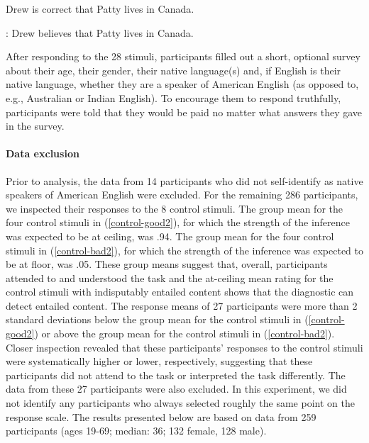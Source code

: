 \documentclass[11pt,fleqn]{article}
\newcommand{\6}{\mbox{$[\hspace*{-.6mm}[$}}
\newcommand{\9}{\mbox{$]\hspace*{-.6mm}]$}}
\begin{document}
\begin{exe}
\ex\label{train2}
\begin{xlist}
 Drew is correct that Patty lives in Canada. 

: Drew believes that Patty lives in Canada.
\end{xlist}
\end{exe}

After responding to the 28 stimuli, participants filled out a short, optional survey about their age, their gender, their native language(s) and, if English is their native language, whether they are a speaker of American English (as opposed to, e.g., Australian or Indian English). To encourage them to respond truthfully, participants were told that they would be paid no matter what answers they gave in the survey.

\paragraph{Data exclusion}

Prior to analysis, the data from 14 participants who did not self-identify as native speakers of American English were excluded. For the remaining 286 participants, we inspected their responses to the 8 control stimuli. The group mean for the four control stimuli in (\ref{control-good2}), for which the strength of the inference was expected to be at ceiling, was .94. The group mean for the four control stimuli in (\ref{control-bad2}), for which the strength of the inference was expected to be at floor, was .05. These group means suggest that, overall, participants attended to and understood the task and the at-ceiling mean rating for the control stimuli with indisputably entailed content shows that the diagnostic can detect entailed content. The response means of 27 participants were more than 2 standard deviations below the group mean for the control stimuli in (\ref{control-good2}) or above the group mean for the control stimuli in (\ref{control-bad2}). Closer inspection revealed that these participants' responses to the control stimuli were systematically higher or lower, respectively, suggesting that these participants did not attend to the task or interpreted the task differently. The data from these 27 participants were also excluded. In this experiment, we did not identify any participants who always selected roughly the same point on the response scale. The results presented below are based on data from 259 participants (ages 19-69; median: 36; 132 female, 128 male). %
\end{document}
